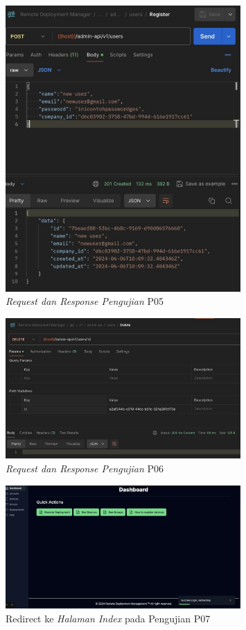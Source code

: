 \begin{figure}[ht]
  \centering
  \includegraphics[width=0.8\textwidth]{resources/chapter-4/pengujian/p05.jpg}
  \caption{\textit{Request dan Response Pengujian} P05}
  \label{fig:pengujian-p05}
\end{figure}

\begin{figure}[ht]
  \centering
  \includegraphics[width=0.8\textwidth]{resources/chapter-4/pengujian/p06.jpg}
  \caption{\textit{Request dan Response Pengujian} P06}
  \label{fig:pengujian-p06}
\end{figure}

\begin{figure}[ht]
  \centering
  \includegraphics[width=0.8\textwidth]{resources/chapter-4/pengujian/p07.jpg}
  \caption{Redirect ke \textit{Halaman Index} pada Pengujian P07}
  \label{fig:pengujian-p07}
\end{figure}

